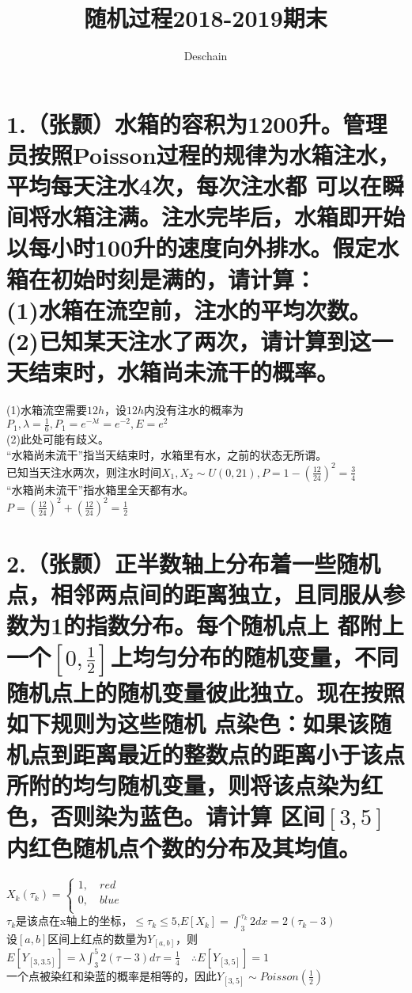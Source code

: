 \documentclass[UTF8]{ctexart}
\title{随机过程2018-2019期末}
\author{Deschain}
\begin{document}
\maketitle
\section*{1.（张颢）水箱的容积为1200升。管理员按照Poisson过程的规律为水箱注水，平均每天注水4次，每次注水都
  可以在瞬间将水箱注满。注水完毕后，水箱即开始以每小时100升的速度向外排水。假定水箱在初始时刻是满的，请计算：\\
  (1)水箱在流空前，注水的平均次数。\\
  (2)已知某天注水了两次，请计算到这一天结束时，水箱尚未流干的概率。}
 (1)水箱流空需要$12h$，设$12h$内没有注水的概率为$P_1,\lambda=\frac{1}{6},P_1=e^{-\lambda t}=e^{-2},
  E=e^2$\\
(2)此处可能有歧义。\\
“水箱尚未流干”指当天结束时，水箱里有水，之前的状态无所谓。\\
已知当天注水两次，则注水时间$X_1,X_2\sim U(0,21),P=1-(\frac{12}{24})^2=\frac{3}{4}$\\
“水箱尚未流干”指水箱里全天都有水。\\
$P=(\frac{12}{24})^2+(\frac{12}{24})^2=\frac{1}{2}$
\section*{2.（张颢）正半数轴上分布着一些随机点，相邻两点间的距离独立，且同服从参数为1的指数分布。每个随机点上
  都附上一个$[0,\frac{1}{2}]$上均匀分布的随机变量，不同随机点上的随机变量彼此独立。现在按照如下规则为这些随机
  点染色：如果该随机点到距离最近的整数点的距离小于该点所附的均匀随机变量，则将该点染为红色，否则染为蓝色。请计算
  区间$[3,5]$内红色随机点个数的分布及其均值。}
$X_k(\tau_k)=\begin{cases}
    1,\quad red  \\
    0,\quad blue \\
  \end{cases}$\\
$\tau_k$是该点在x轴上的坐标，$\leq\tau_k\leq5$,$E[X_k]=\int_3^{\tau_k}2dx=2(\tau_k-3)$\\
设$[a,b]$区间上红点的数量为$Y_{[a,b]}$，则$E[Y_{[3,3.5]}]=\lambda\int_3^5 2(\tau-3)d\tau
  =\frac{1}{4}\quad\therefore E[Y_{[3,5]}]=1$\\
一个点被染红和染蓝的概率是相等的，因此$Y_{[3,5]}\sim Poisson(\frac{1}{2})$
\end{document}
